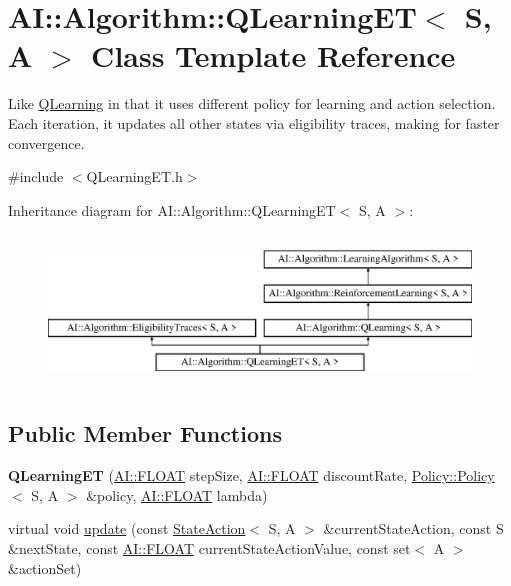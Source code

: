 \hypertarget{classAI_1_1Algorithm_1_1QLearningET}{\section{A\+I\+:\+:Algorithm\+:\+:Q\+Learning\+E\+T$<$ S, A $>$ Class Template Reference}
\label{classAI_1_1Algorithm_1_1QLearningET}
}


Like \hyperlink{classAI_1_1Algorithm_1_1QLearning}{Q\+Learning} in that it uses different policy for learning and action selection. Each iteration, it updates all other states via eligibility traces, making for faster convergence.  




{\ttfamily \#include $<$Q\+Learning\+E\+T.\+h$>$}

Inheritance diagram for A\+I\+:\+:Algorithm\+:\+:Q\+Learning\+E\+T$<$ S, A $>$\+:\begin{figure}[H]
\begin{center}
\leavevmode
\includegraphics[height=4.000000cm]{classAI_1_1Algorithm_1_1QLearningET}
\end{center}
\end{figure}
\subsection*{Public Member Functions}
\begin{DoxyCompactItemize}
\item 
\hypertarget{classAI_1_1Algorithm_1_1QLearningET_ae1c5b2ba1a680bb8bd2cfaa64dc41e91}{{\bfseries Q\+Learning\+E\+T} (\hyperlink{namespaceAI_a41b74884a20833db653dded3918e05c3}{A\+I\+::\+F\+L\+O\+A\+T} step\+Size, \hyperlink{namespaceAI_a41b74884a20833db653dded3918e05c3}{A\+I\+::\+F\+L\+O\+A\+T} discount\+Rate, \hyperlink{classAI_1_1Algorithm_1_1Policy_1_1Policy}{Policy\+::\+Policy}$<$ S, A $>$ \&policy, \hyperlink{namespaceAI_a41b74884a20833db653dded3918e05c3}{A\+I\+::\+F\+L\+O\+A\+T} lambda)}\label{classAI_1_1Algorithm_1_1QLearningET_ae1c5b2ba1a680bb8bd2cfaa64dc41e91}

\item 
virtual void \hyperlink{classAI_1_1Algorithm_1_1QLearningET_a9a245dcb3ca8f26b37e5a6daa6d4a898}{update} (const \hyperlink{classAI_1_1StateAction}{State\+Action}$<$ S, A $>$ \&current\+State\+Action, const S \&next\+State, const \hyperlink{namespaceAI_a41b74884a20833db653dded3918e05c3}{A\+I\+::\+F\+L\+O\+A\+T} current\+State\+Action\+Value, const set$<$ A $>$ \&action\+Set)
\end{DoxyCompactItemize}
